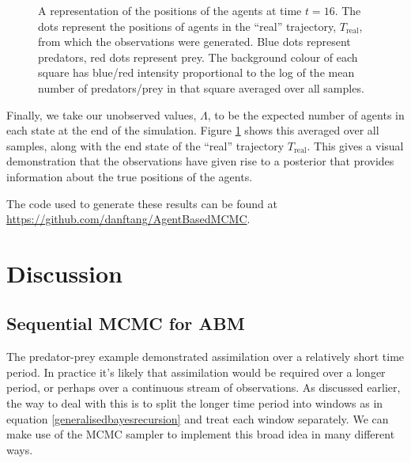 \documentclass{article}
\begin{document}
\begin{figure}
	\centering
	\caption{A representation of the positions of the agents at time $t=16$. The dots represent the positions of agents in the ``real'' trajectory, $T_{\text{real}}$, from which the observations were generated. Blue dots represent predators, red dots represent prey. The background colour of each square has blue/red intensity proportional to the log of the mean number of predators/prey in that square averaged over all samples.}
	\label{figEndState}
\end{figure}

Finally, we take our unobserved values, $\Lambda$, to be the expected number of agents in each state at the end of the simulation. Figure \ref{figEndState} shows this averaged over all samples, along with the end state of the ``real'' trajectory $T_{\text{real}}$. This gives a visual demonstration that the observations have given rise to a posterior that provides information about the true positions of the agents.

The code used to generate these results can be found at \url{https://github.com/danftang/AgentBasedMCMC}.

\section{Discussion} 
\label{discussion}

 
\subsection{Sequential MCMC for ABM}

The predator-prey example demonstrated assimilation over a relatively short time period. In practice it's likely that assimilation would be required over a longer period, or perhaps over a continuous stream of observations. As discussed earlier, the way to deal with this is to split the longer time period into windows as in equation \eqref{generalisedbayesrecursion} and treat each window separately. We can make use of the MCMC sampler to implement this broad idea in many different ways.
\end{document}

